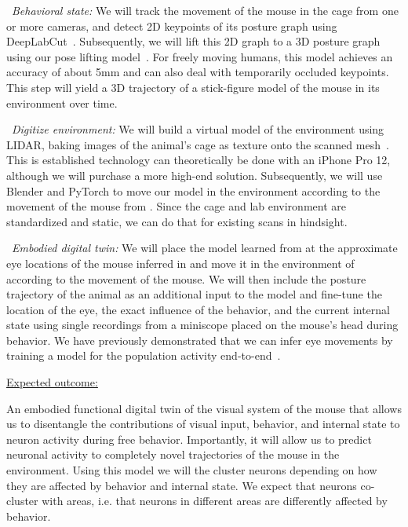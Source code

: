 \documentclass[COG,11pt]{ercgrant}
\begin{document}
~\textit{Behavioral state:} 
We will track the movement of the mouse in the cage from one or more cameras, and detect 2D keypoints of its posture graph using DeepLabCut~\parencite{Mathis2018-lk}. 
Subsequently, we will lift this 2D graph to a 3D posture graph using our pose lifting model~\parencite{Pierzchlewicz2022-tq}. 
For freely moving humans, this model achieves an accuracy of about 5mm and can also deal with temporarily occluded keypoints. 
This step will yield a 3D trajectory of a stick-figure model of the mouse in its environment over time. 

~\textit{Digitize environment:} 
We will build a virtual model of the environment using LIDAR, baking images of the animal's cage as texture onto the scanned mesh~\parencite[similar as in][]{Holmgren2021-jv}.
This is established technology can theoretically be done with an iPhone Pro 12, although we will purchase a more high-end solution.
Subsequently, we will use Blender and PyTorch to move our model in the environment according to the movement of the mouse from .
Since the cage and lab environment are standardized and static, we can do that for existing scans in hindsight.

~\textit{Embodied digital twin:} 
We will place the model learned from  at the approximate eye locations of the mouse inferred in  and move it in the environment of  according to the movement of the mouse. 
We will then include the posture trajectory of the animal as an additional input to the model and fine-tune the location of the eye, the exact influence of the behavior, and the current internal state using single recordings from a miniscope placed on the mouse's head during behavior. 
We have previously demonstrated that we can infer eye movements by training a model for the population activity end-to-end~\parencite{Sinz2018-sk}.

\underline{Expected outcome:} 


An embodied functional digital twin of the visual system of the mouse that allows us to disentangle the contributions of visual input, behavior, and internal state to neuron activity during free behavior. 
Importantly, it will allow us to predict neuronal activity to completely novel trajectories of the mouse in the environment.
Using this model we will the cluster neurons depending on how they are affected by behavior and internal state.
We expect that neurons co-cluster with areas, i.e. that neurons in different areas are differently affected by behavior. 
\end{document}
